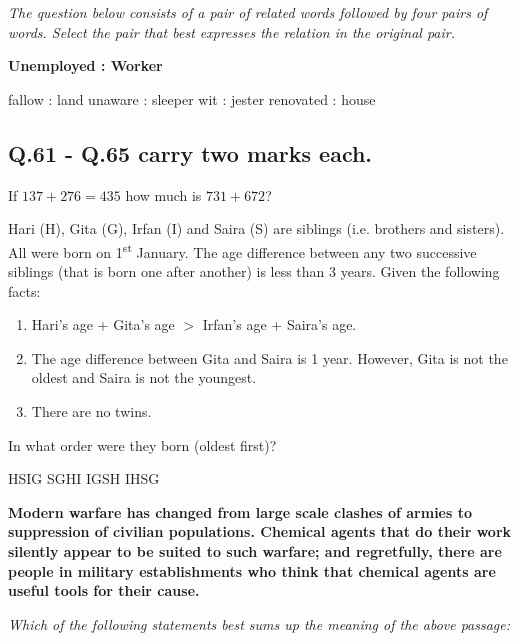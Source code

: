 \documentclass{exam}
\begin{document}
\begin{questions}
\begin{oneparchoices}
	   
\end{oneparchoices}

\question \textit{The question below consists of a pair of related words followed by four pairs of words. Select the pair that best expresses the relation in the original pair.}\hfill{}
	\par\noindent\textbf{Unemployed : Worker}

\begin{oneparchoices}
	\choice fallow : land \choice unaware : sleeper \choice wit : jester \choice renovated : house
\end{oneparchoices}

\subsection*{Q.61 - Q.65 carry two marks each.}

\question If $137 + 276 = 435$ how much is $731 + 672$?\hfill{}

\begin{oneparchoices}
	   
\end{oneparchoices}

\question Hari (H), Gita (G), Irfan (I) and Saira (S) are siblings (i.e. brothers and sisters). All were born on 1\textsuperscript{st} January. The age difference between any two successive siblings (that is born one after another) is less than 3 years. Given the following facts:

\begin{enumerate}
		\item Hari's age + Gita's age $>$ Irfan's age + Saira's age.
		\item The age difference between Gita and Saira is 1 year. However, Gita is not the oldest and Saira is not the youngest.
		\item There are no twins.
	\end{enumerate}
	In what order were they born (oldest first)?\hfill{}


\begin{oneparchoices}
	\choice HSIG \choice SGHI \choice IGSH \choice IHSG
\end{oneparchoices}

\question \textbf{Modern warfare has changed from large scale clashes of armies to suppression of civilian populations. Chemical agents that do their work silently appear to be suited to such warfare; and regretfully, there are people in military establishments who think that chemical agents are useful tools for their cause.}
	\par\noindent \textit{Which of the following statements best sums up the meaning of the above passage:}\hfill{}


\end{questions}
\end{document}
